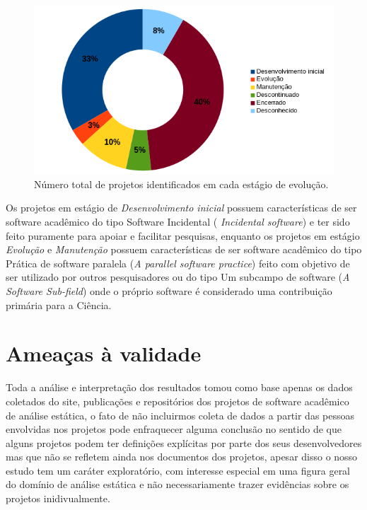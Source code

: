 \begin{figure}[h]
  \begin{minipage}{0.5\textwidth}
    \centering
    \includegraphics[scale=0.55]{imagens/life-cycle-pie.png}
  \end{minipage}
  \begin{minipage}{0.5\textwidth}
    \centering
    
  \end{minipage}
  \caption{Número total de projetos identificados em cada estágio de evolução.}
  \label{life-cycle}
\end{figure}

Os projetos em estágio de {\it Desenvolvimento inicial} possuem
características de ser software acadêmico do tipo Software Incidental ({\it
Incidental software}) e ter sido feito puramente para apoiar e facilitar
pesquisas, enquanto os projetos em estágio {\it Evolução} e {\it Manutenção}
possuem características de ser software acadêmico do tipo Prática de software
paralela ({\it A parallel software practice}) feito com objetivo de ser
utilizado por outros pesquisadores ou do tipo Um subcampo de software ({\it A Software
Sub-field}) onde o próprio software é considerado uma contribuição primária
para a Ciência.


\section{Ameaças à validade} %

Toda a análise e interpretação dos resultados tomou como base apenas os dados
coletados do site, publicações e repositórios dos projetos de software
acadêmico de análise estática, o fato de não incluirmos coleta de dados a
partir das pessoas envolvidas nos projetos pode enfraquecer alguma conclusão no
sentido de que alguns projetos podem ter definições explícitas por parte dos
seus desenvolvedores mas que não se refletem ainda nos documentos dos projetos,
apesar disso o nosso estudo tem um caráter exploratório, com interesse especial em
uma figura geral do domínio de análise estática e não necessariamente trazer
evidências sobre os projetos inidivualmente.


